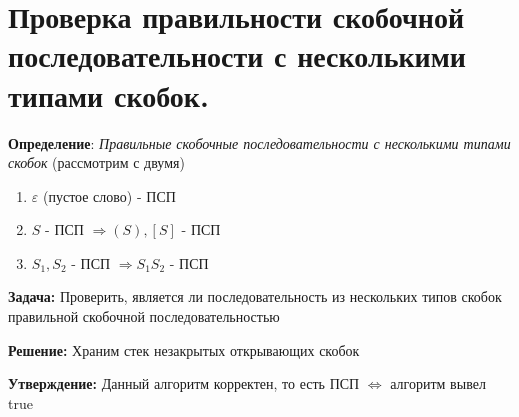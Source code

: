 \setcounter{section}{8}
\section{Проверка правильности скобочной последовательности с несколькими типами скобок.}
\par \textbf{Определение}: \textit{Правильные скобочные последовательности с несколькими типами скобок} (рассмотрим с двумя)
\begin{enumerate}
    \item $\varepsilon$ (пустое слово) - ПСП
    \item $S$ - ПСП $\Rightarrow (S), [S]$ - ПСП
    \item $S_1, S_2$ - ПСП $\Rightarrow S_1 S_2$ - ПСП 
\end{enumerate}
\par \textbf{Задача:} Проверить, является ли последовательность из нескольких типов скобок правильной скобочной последовательностью
\par \textbf{Решение:} Храним стек незакрытых открывающих скобок

\par \textbf{Утверждение:} Данный алгоритм корректен, то есть ПСП $\Leftrightarrow$ алгоритм вывел true
